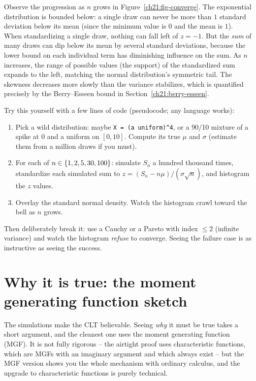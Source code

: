 \begin{happeningbox}
Observe the progression as $n$ grows in
Figure~\ref{ch21:fig-converge}. The exponential distribution is bounded below: a single draw
can never be more than $1$ standard deviation below its mean (since the minimum value
is $0$ and the mean is $1$). When standardizing a single draw, nothing can fall left
of $z=-1$. But the \emph{sum} of many draws can dip below its mean by several standard
deviations, because the lower bound on each individual term has diminishing influence on the sum.
As $n$ increases, the range of possible values (the support) of the standardized sum expands to the left, matching the
normal distribution's symmetric tail. The skewness decreases more slowly than the variance
stabilizes, which is quantified precisely by the Berry--Esseen bound in
Section~\ref{ch21:berry-esseen}.
\end{happeningbox}

\begin{labbox}
Try this yourself with a few lines of code (pseudocode; any language works):
\begin{enumerate}
\item Pick a wild distribution: maybe \texttt{X = (a uniform)\^{}4}, or a 90/10 mixture
of a spike at $0$ and a uniform on $[0,10]$. Compute its true $\mu$ and $\sigma$
(estimate them from a million draws if you must).
\item For each of $n \in \{1, 2, 5, 30, 100\}$: simulate $S_n$ a hundred thousand
times, standardize each simulated sum to $z = (S_n - n\mu)/(\sigma\sqrt n)$, and histogram
the $z$ values.
\item Overlay the standard normal density. Watch the histogram crawl toward the bell as
$n$ grows.
\end{enumerate}
Then deliberately break it: use a Cauchy or a Pareto with index $\le 2$ (infinite
variance) and watch the histogram \emph{refuse} to converge. Seeing the failure case is
as instructive as seeing the success.
\end{labbox}

\section{Why it is true: the moment generating function sketch}
\label{ch21:why}

The simulations make the CLT believable. Seeing \emph{why} it must be true takes a
short argument, and the cleanest one uses the moment generating function (MGF). It is not fully
rigorous -- the airtight proof uses characteristic functions, which are MGFs with an
imaginary argument and which always exist -- but the MGF version shows you the whole
mechanism with ordinary calculus, and the upgrade to characteristic functions is purely
technical.

